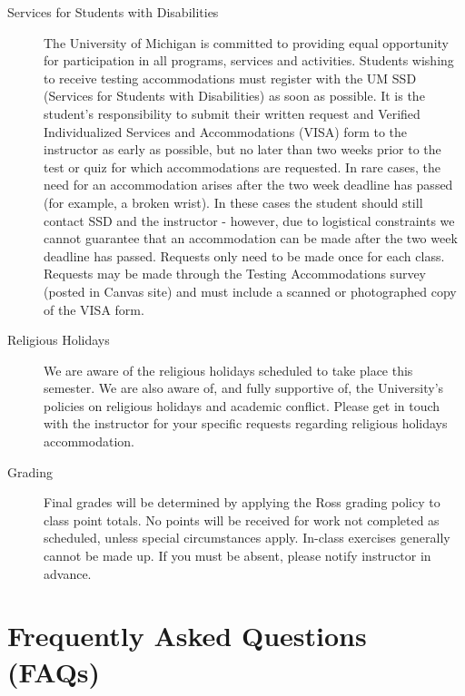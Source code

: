 \documentclass[11pt, letterpaper, twoside]{memoir}\usepackage{knitr}
\begin{document}
\begin{description}
\item [Services for Students with Disabilities] The University of Michigan is committed to providing equal opportunity for participation in all programs, services and activities. Students wishing to receive testing accommodations must register with the UM SSD (Services for Students with Disabilities) as soon as possible. It is the student's responsibility to submit their written request and Verified Individualized Services and Accommodations (VISA) form to the instructor as early as possible, but no later than two weeks prior to the test or quiz for which accommodations are requested. In rare cases, the need for an accommodation arises after the two week deadline has passed (for example, a broken wrist). In these cases the student should still contact SSD and the instructor - however, due
to logistical constraints we cannot guarantee that an accommodation can be made after the two week deadline has passed. Requests only need to be made once for each class. Requests may be made through the Testing Accommodations survey (posted in Canvas site) and must include a scanned or photographed copy of the VISA form.

\item [Religious Holidays] We are aware of the religious holidays scheduled to take place this semester. We are also aware of, and fully supportive of, the University's policies on religious holidays and academic conflict. Please get in touch with the instructor for your specific requests regarding religious holidays accommodation.

\item [Grading] Final grades will be determined by applying the Ross grading policy to class point totals. No points will be received for work not completed as scheduled, unless special circumstances apply. In-class exercises generally cannot be made up. If you must be absent, please notify instructor in advance. 

\end{description}

\section{Frequently Asked Questions (FAQs)}
\end{document}
